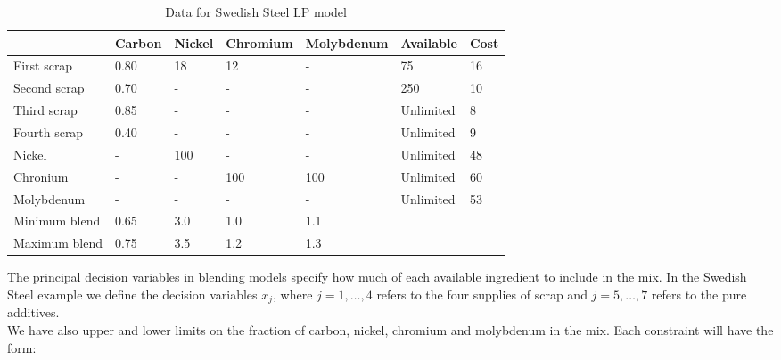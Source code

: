 \documentclass[a4paper,10 pt,titlepage,twoside]{book}
\theoremstyle{plain}
\theoremstyle{definition}
\theoremstyle{remark}
\begin{document}
\begin{table}[h]\caption{\label{table:carbon}Data for Swedish Steel LP model}
\begin{center}
	\begin{tabular}{@{}lllllll@{}}
		\toprule
		& Carbon & Nickel & Chromium & Molybdenum & Available & Cost \\ \midrule
		First scrap   & 0.80   & 18     & 12       & -          & 75        & 16   \\
		Second scrap  & 0.70   & -      & -        & -          & 250       & 10   \\
		Third scrap   & 0.85   & -      & -        & -          & Unlimited & 8    \\
		Fourth scrap  & 0.40   & -      & -        & -          & Unlimited & 9    \\
		Nickel        & -      & 100    & -        & -          & Unlimited & 48   \\
		Chronium      & -      & -      & 100      & 100        & Unlimited & 60   \\
		Molybdenum    & -      & -      & -        & -          & Unlimited & 53   \\ \midrule
		Minimum blend & 0.65   & 3.0    & 1.0      & 1.1        &           &      \\ 
		Maximum blend & 0.75   & 3.5    & 1.2      & 1.3        &           &      \\ \midrule
	\end{tabular}
\end{center}
\end{table}
The principal decision variables in blending models specify how much of each available ingredient to include in the mix. In the Swedish Steel example we define the decision variables $x_{j}$, where $j = 1, \dots, 4$ refers to the four supplies of scrap and $j = 5, \dots, 7$ refers to the pure additives.\\
We have also upper and lower limits on the fraction of carbon, nickel, chromium and molybdenum in the mix. Each constraint will have the form: 
\end{document}
